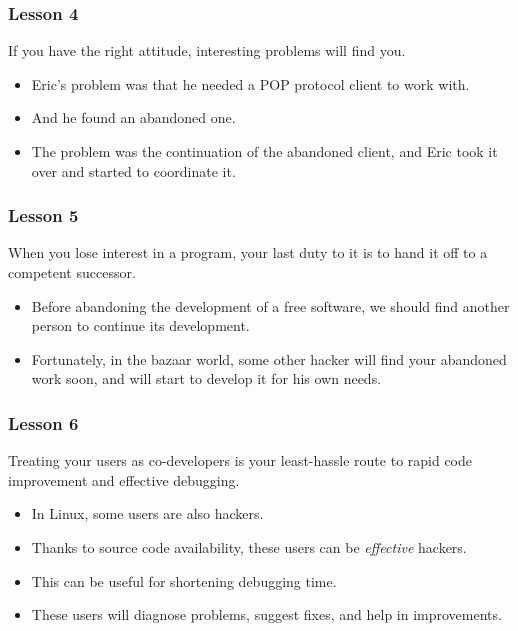 \documentclass{beamer}
\begin{document}
\begin{frame}
\frametitle{Lesson 4}

\begin{center}
{\large If you have the right attitude, interesting problems will find you.}
\end{center}

\begin{itemize}
\item Eric's problem was that he needed a POP protocol client to work
  with.
\item And he found an abandoned one.
\item The problem was the continuation of the abandoned client, and
  Eric took it over and started to coordinate it.
\end{itemize}

\end{frame}

\begin{frame}
\frametitle{Lesson 5}

\begin{center}
{\large When you lose interest in a program, your last duty to it is to hand it off to a competent successor.}
\end{center}

\begin{itemize}
\item Before abandoning the development of a free software,
  we should find another person to continue its development.
\item Fortunately, in the bazaar world, some other hacker will find
  your abandoned work soon, and will start to develop it for his own
  needs.
\end{itemize}

\end{frame}

\begin{frame}
\frametitle{Lesson 6}

\begin{center}
{\large Treating your users as co-developers is your least-hassle route to rapid code improvement and effective debugging.}
\end{center}

\begin{itemize}
\item In Linux, some users are also hackers.
\item Thanks to source code availability, these users can be {\em
    effective} hackers.
\item This can be useful for shortening debugging time.
\item These users will diagnose problems, suggest fixes, and help in
  improvements.
\end{itemize}

\end{frame}
\end{document}
